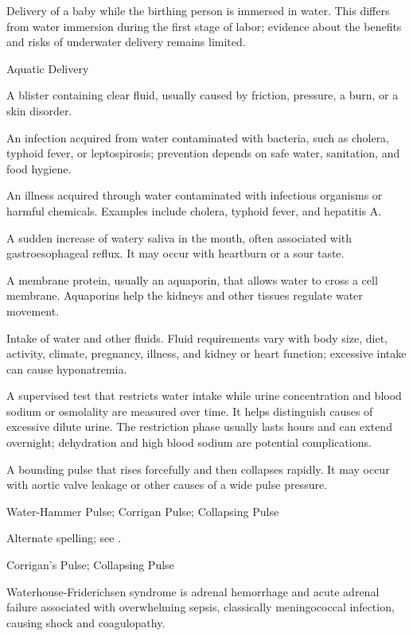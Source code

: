  Delivery of a baby while the birthing person is immersed in water. This differs from water immersion during the first stage of labor; evidence about the benefits and risks of underwater delivery remains limited.

\synonyms
Aquatic Delivery

 A blister containing clear fluid, usually caused by friction, pressure, a burn, or a skin disorder.

 An infection acquired from water contaminated with bacteria, such as cholera, typhoid fever, or leptospirosis; prevention depends on safe water, sanitation, and food hygiene.

 An illness acquired through water contaminated with infectious organisms or harmful chemicals. Examples include cholera, typhoid fever, and hepatitis A.

 A sudden increase of watery saliva in the mouth, often associated with gastroesophageal reflux. It may occur with heartburn or a sour taste.

 A membrane protein, usually an aquaporin, that allows water to cross a cell membrane. Aquaporins help the kidneys and other tissues regulate water movement.

 Intake of water and other fluids. Fluid requirements vary with body size, diet, activity, climate, pregnancy, illness, and kidney or heart function; excessive intake can cause hyponatremia.

 A supervised test that restricts water intake while urine concentration and blood sodium or osmolality are measured over time. It helps distinguish causes of excessive dilute urine. The restriction phase usually lasts hours and can extend overnight; dehydration and high blood sodium are potential complications.

 A bounding pulse that rises forcefully and then collapses rapidly. It may occur with aortic valve leakage or other causes of a wide pulse pressure.

\synonyms
Water-Hammer Pulse; Corrigan Pulse; Collapsing Pulse

 Alternate spelling; see .

\synonyms
Corrigan's Pulse; Collapsing Pulse

 Waterhouse-Friderichsen syndrome is adrenal hemorrhage and acute adrenal failure associated with overwhelming sepsis, classically meningococcal infection, causing shock and coagulopathy.

